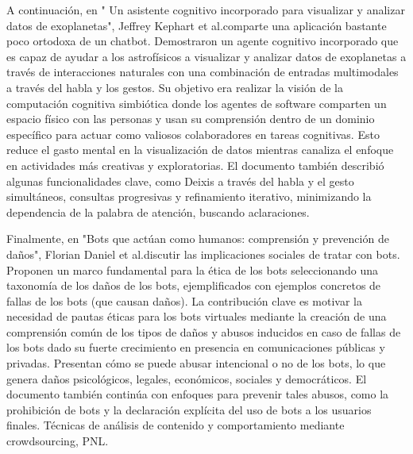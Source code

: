 A continuación, en " Un asistente cognitivo incorporado para visualizar y analizar datos de exoplanetas", Jeffrey Kephart et al.comparte una aplicación bastante poco ortodoxa de un chatbot. Demostraron un agente cognitivo incorporado que es capaz de ayudar a los astrofísicos a visualizar y analizar datos de exoplanetas a través de interacciones naturales con una combinación de entradas multimodales a través del habla y los gestos. Su objetivo era realizar la visión de la computación cognitiva simbiótica donde los agentes de software comparten un espacio físico con las personas y usan su comprensión dentro de un dominio específico para actuar como valiosos colaboradores en tareas cognitivas. Esto reduce el gasto mental en la visualización de datos mientras canaliza el enfoque en actividades más creativas y exploratorias. El documento también describió algunas funcionalidades clave, como Deixis a través del habla y el gesto simultáneos, consultas progresivas y refinamiento iterativo, minimizando la dependencia de la palabra de atención, buscando aclaraciones.

Finalmente, en "Bots que actúan como humanos: comprensión y prevención de daños", Florian Daniel et al.discutir las implicaciones sociales de tratar con bots. Proponen un marco fundamental para la ética de los bots seleccionando una taxonomía de los daños de los bots, ejemplificados con ejemplos concretos de fallas de los bots (que causan daños). La contribución clave es motivar la necesidad de pautas éticas para los bots virtuales mediante la creación de una comprensión común de los tipos de daños y abusos inducidos en caso de fallas de los bots dado su fuerte crecimiento en presencia en comunicaciones públicas y privadas. Presentan cómo se puede abusar intencional o no de los bots, lo que genera daños psicológicos, legales, económicos, sociales y democráticos. El documento también continúa con enfoques para prevenir tales abusos, como la prohibición de bots y la declaración explícita del uso de bots a los usuarios finales. Técnicas de análisis de contenido y comportamiento mediante crowdsourcing, PNL.


